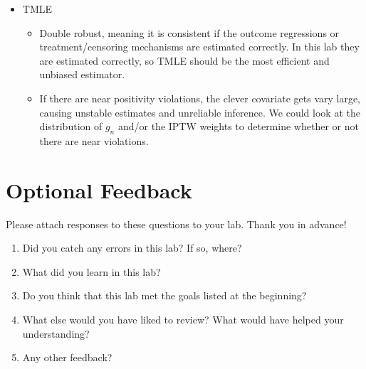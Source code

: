 \documentclass[answers]{exam}
\begin{document}
\begin{solution}
\begin{itemize}
\begin{itemize}
\end{itemize}
\item TMLE
\begin{itemize}
\item Double robust, meaning it is consistent if the outcome regressions or treatment/censoring mechanisms are estimated correctly. In this lab they are estimated correctly, so TMLE should be the most efficient and unbiased estimator. 
\item If there are near positivity violations, the clever covariate gets vary large, causing unstable estimates and unreliable inference. We could look at the distribution of  $g_n$ and/or the IPTW weights to determine whether or not there are near violations. 
\end{itemize}
\end{itemize}



\end{solution}




\pagebreak
\section{Optional Feedback}

Please attach responses to these questions to your lab. Thank you in advance!

\begin{enumerate}
\item Did you catch any errors in this lab? If so, where?
\item What did you learn in this lab?
\item Do you think that this lab met the goals listed at the beginning? 
\item What else would you have liked to review? What would have helped your understanding?
\item Any other feedback?
\end{enumerate}
\end{document}
